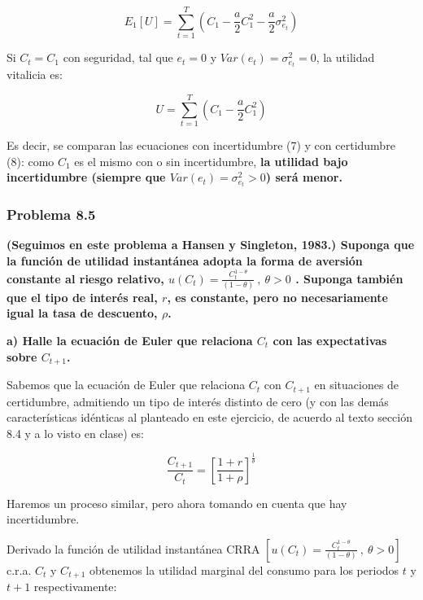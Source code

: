 \documentclass[
]{article}
\begin{document}
\begin{equation}
E_{1}[U] = \sum_{t=1}^{T}(C_{1} - \frac{a}{2}C_{1}^{2} - \frac{a}{2}\sigma_{e_{t}}^{2})
\end{equation}

Si \(C_{t} = C_{1}\) con seguridad, tal que \(e_{t} = 0\) y
\(Var(e_{t}) = \sigma_{e_{t}}^{2} = 0\), la utilidad vitalicia es:

\begin{equation}
U = \sum_{t=1}^{T}(C_{1} - \frac{a}{2}C_{1}^{2})
\end{equation}

Es decir, se comparan las ecuaciones con incertidumbre (7) y con
certidumbre (8): como \(C_{1}\) es el mismo con o sin incertidumbre,
\textbf{la utilidad bajo incertidumbre (siempre que
\(Var(e_{t}) = \sigma_{e_{t}}^{2} > 0\)) será menor.}

\hypertarget{problema-8.5}{%
\subsubsection{Problema 8.5}\label{problema-8.5}}

\textbf{(Seguimos en este problema a Hansen y Singleton, 1983.) Suponga
que la función de utilidad instantánea adopta la forma de aversión
constante al riesgo relativo,
\(u(C_t)=\frac{C_t^{1-\theta}}{(1-\theta)} \ , \ \theta>0\) . Suponga
también que el tipo de interés real, \(r\), es constante, pero no
necesariamente igual la tasa de descuento, \(\rho\).}

\textbf{a) Halle la ecuación de Euler que relaciona \(C_t\) con las
expectativas sobre \(C_{t+1}\).}

Sabemos que la ecuación de Euler que relaciona \(C_t\) con \(C_{t+1}\)
en situaciones de certidumbre, admitiendo un tipo de interés distinto de
cero (y con las demás características idénticas al planteado en este
ejercicio, de acuerdo al texto sección 8.4 y a lo visto en clase) es:

\setcounter{equation}{0}

\begin{equation}
\frac{C_{t+1}}{C_t}=[\frac{1+r}{1+\rho}]^\frac{1}{\theta}
\end{equation}

Haremos un proceso similar, pero ahora tomando en cuenta que hay
incertidumbre.

Derivado la función de utilidad instantánea CRRA
\([u(C_t)=\frac{C_t^{1-\theta}}{(1-\theta)} \ , \ \theta>0]\) c.r.a.
\(C_t\) y \(C_{t+1}\) obtenemos la utilidad marginal del consumo para
los periodos \(t\) y \(t+1\) respectivamente:
\end{document}
